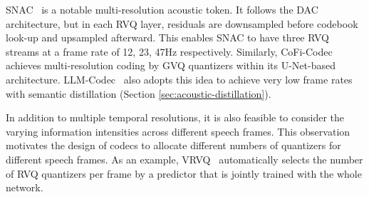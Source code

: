 SNAC~\cite{Siuzdak_SNAC_Multi-Scale_Neural_2024} is a notable multi-resolution acoustic token.
It follows the DAC~\cite{kumar2024high} architecture, but in each RVQ layer, residuals are downsampled before codebook look-up and upsampled afterward.
This enables SNAC to have three RVQ streams at a frame rate of 12, 23, 47Hz respectively.
Similarly, CoFi-Codec~\cite{guo2024speaking} achieves multi-resolution coding by GVQ quantizers within its U-Net-based architecture.
LLM-Codec~\cite{yang2024uniaudio15} also adopts this idea to achieve very low frame rates with semantic distillation (Section \ref{sec:acoustic-distillation}).

In addition to multiple temporal resolutions, it is also feasible to consider the varying information intensities across different speech frames. 
This observation motivates the design of codecs to allocate different numbers of quantizers for different speech frames.
As an example, VRVQ~\cite{chae2024variable} automatically selects the number of RVQ quantizers per frame by a predictor that is jointly trained with the whole network.

